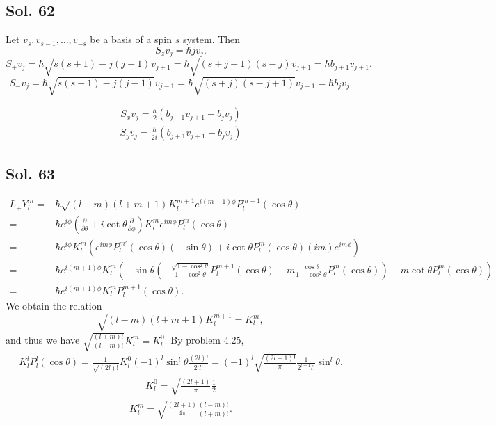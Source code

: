 \subsection*{Sol. 62}
Let $v_s, v_{s-1},\dots, v_{-s}$ be a basis of a spin $s$ system. Then 
$$
S_zv_j = \hbar j v_j.
$$
$$
S_+v_j 
= \hbar \sqrt{s(s+1)-j(j+1)}v_{j+1}
=\hbar \sqrt{(s+j+1)(s-j)}v_{j+1}
=\hbar b_{j+1}v_{j+1}.
$$
$$
S_-v_j = \hbar \sqrt{s(s+1)-j(j-1)}v_{j-1}
=\hbar \sqrt{(s+j)(s-j+1)}v_{j-1}=\hbar b_jv_j.
$$

\begin{align*}
    S_xv_j = \frac{\hbar}{2}(b_{j+1}v_{j+1} + b_j v_j)
\end{align*}
\begin{align*}
    S_yv_j = \frac{\hbar}{2i}(b_{j+1}v_{j+1} - b_j v_j)
\end{align*}

\subsection*{Sol. 63}
\begin{align*}
    L_+Y^m_l=&\hbar\sqrt{(l-m)(l+m+1)}
    K^{m+1}_le^{i(m+1)\phi}P^{m+1}_l(\cos\theta)\\
    =&\hbar e^{i\phi}(\frac{\partial}{\partial\theta}+i\cot\theta\frac{\partial}{\partial\phi})
    K^m_le^{im\phi}P^m_l(\cos\theta)\\
    =&\hbar e^{i\phi}K^m_l
    (e^{im\phi}P^{m'}_l(\cos\theta)(-\sin\theta)
    +i\cot\theta P^{m}_l(\cos\theta)(im)e^{im\phi})\\
    =&\hbar e^{i(m+1)\phi}K^m_l
    (-\sin\theta (-\frac{\sqrt{1-\cos^2\theta}}{1-\cos^2\theta}P^{m+1}_l(\cos\theta) - 
    m\frac{\cos\theta}{1-\cos^2\theta}P^m_l(\cos\theta))
    -m\cot\theta P^{m}_l(\cos\theta))\\
    =&\hbar e^{i(m+1)\phi}K_l^mP^{m+1}_l(\cos\theta).
\end{align*}
We obtain the relation
$$
\sqrt{(l-m)(l+m+1)}K_l^{m+1} = K^m_l,
$$
and thus we have $ \sqrt{\frac{(l+m)!}{(l-m)!}}K^m_l =K^0_l.$
By problem 4.25,
\begin{align*}
    K^{l}_lP^l_l(\cos\theta)
    =
    \frac{1}{\sqrt{(2l)!}}K^0_l
    (-1)^l\sin^l\theta \frac{(2l)!}{2^l l!}=(-1)^l\sqrt{\frac{(2l+1)!}{\pi}}\frac{1}{2^{l+1}l!}\sin^l\theta.
\end{align*}
\begin{align*}
    K^0_l = 
    \sqrt{\frac{(2l+1)}{\pi}}\frac{1}{2}
\end{align*}
\begin{align*}
    K^m_l 
    =\sqrt{\frac{(2l+1)}{4\pi}
    \frac{(l-m)!}{(l+m)!}}.
\end{align*}

